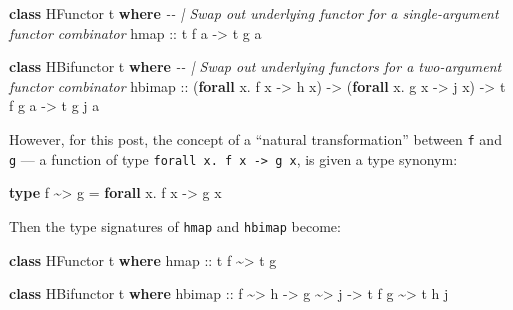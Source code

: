 \documentclass[]{article}
\newenvironment{Shaded}{}{}
\newcommand{\CommentTok}[1]{\textcolor[rgb]{0.38,0.63,0.69}{\textit{#1}}}
\newcommand{\DataTypeTok}[1]{\textcolor[rgb]{0.56,0.13,0.00}{#1}}
\newcommand{\KeywordTok}[1]{\textcolor[rgb]{0.00,0.44,0.13}{\textbf{#1}}}
\newcommand{\NormalTok}[1]{#1}
\newcommand{\OperatorTok}[1]{\textcolor[rgb]{0.40,0.40,0.40}{#1}}
\newcommand{\OtherTok}[1]{\textcolor[rgb]{0.00,0.44,0.13}{#1}}
\begin{document}
\begin{Shaded}
\begin{Highlighting}[]
\KeywordTok{class} \DataTypeTok{HFunctor}\NormalTok{ t }\KeywordTok{where}
    \CommentTok{{-}{-} | Swap out underlying functor for a single{-}argument functor combinator}
\NormalTok{    hmap}
\OtherTok{        ::}\NormalTok{ t f a }\OtherTok{{-}>}\NormalTok{ t g a}

\KeywordTok{class} \DataTypeTok{HBifunctor}\NormalTok{ t }\KeywordTok{where}
    \CommentTok{{-}{-} | Swap out underlying functors for a two{-}argument functor combinator}
\NormalTok{    hbimap}
\OtherTok{        ::}\NormalTok{ (}\KeywordTok{forall}\NormalTok{ x}\OperatorTok{.}\NormalTok{ f x }\OtherTok{{-}>}\NormalTok{ h x)}
        \OtherTok{{-}>}\NormalTok{ (}\KeywordTok{forall}\NormalTok{ x}\OperatorTok{.}\NormalTok{ g x }\OtherTok{{-}>}\NormalTok{ j x)}
        \OtherTok{{-}>}\NormalTok{ t f g a}
        \OtherTok{{-}>}\NormalTok{ t g j a}
\end{Highlighting}
\end{Shaded}

However, for this post, the concept of a ``natural transformation'' between
\texttt{f} and \texttt{g} --- a function of type
\texttt{forall\ x.\ f\ x\ -\textgreater{}\ g\ x}, is given a type synonym:

\begin{Shaded}
\begin{Highlighting}[]
\KeywordTok{type}\NormalTok{ f }\OperatorTok{\textasciitilde{}>}\NormalTok{ g }\OtherTok{=} \KeywordTok{forall}\NormalTok{ x}\OperatorTok{.}\NormalTok{ f x }\OtherTok{{-}>}\NormalTok{ g x}
\end{Highlighting}
\end{Shaded}

Then the type signatures of \texttt{hmap} and \texttt{hbimap} become:

\begin{Shaded}
\begin{Highlighting}[]
\KeywordTok{class} \DataTypeTok{HFunctor}\NormalTok{ t }\KeywordTok{where}
\NormalTok{    hmap}
\OtherTok{        ::}\NormalTok{ t f }\OperatorTok{\textasciitilde{}>}\NormalTok{ t g}

\KeywordTok{class} \DataTypeTok{HBifunctor}\NormalTok{ t }\KeywordTok{where}
\NormalTok{    hbimap}
\OtherTok{        ::}\NormalTok{ f }\OperatorTok{\textasciitilde{}>}\NormalTok{ h}
        \OtherTok{{-}>}\NormalTok{ g }\OperatorTok{\textasciitilde{}>}\NormalTok{ j}
        \OtherTok{{-}>}\NormalTok{ t f g }\OperatorTok{\textasciitilde{}>}\NormalTok{ t h j}
\end{Highlighting}
\end{Shaded}
\end{document}
